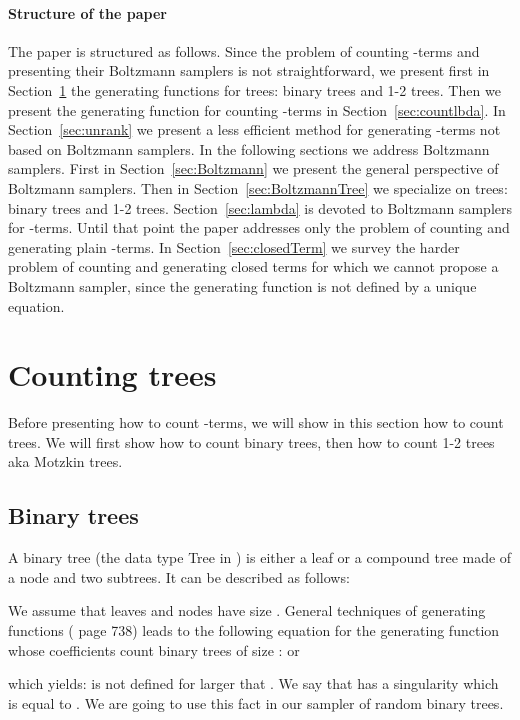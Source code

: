 \documentclass{sig-alternate}
\begin{document}
\paragraph{Structure of the paper}

The paper is structured as follows.  Since the problem of counting -terms and
presenting their Boltzmann samplers is not straightforward, we present first in
Section~\ref{sec:trees} the generating functions for trees: binary trees and 1-2
trees. Then we present the generating function for counting -terms in
Section~\ref{sec:countlbda}.  In Section~\ref{sec:unrank} we present a less efficient
method for generating -terms not based on Boltzmann samplers. In the following
sections we address Boltzmann samplers. First in Section~\ref{sec:Boltzmann} we
present the general perspective of Boltzmann samplers.  Then in
Section~\ref{sec:BoltzmannTree} we specialize on trees: binary trees and 1-2
trees. Section~\ref{sec:lambda} is devoted to Boltzmann samplers for -terms.
Until that point the paper addresses only the problem of counting and generating
plain -terms.  In Section~\ref{sec:closedTerm} we survey the harder problem of
counting and generating closed terms for which we cannot propose a Boltzmann sampler,
since the generating function is not defined by a unique equation.

\section{Counting trees}
\label{sec:trees}

Before presenting how to count -terms, we will show in this section how to count
trees. We will first show how to count binary trees, then how to count 1-2 trees aka
Motzkin trees.

\subsection{Binary trees}
\label{sec:BinTrees}

A binary tree (the data type \textsf{Tree} in \cite{DBLP:conf/icfp/ClaessenH00})
is either a leaf or a compound tree made of a node and two subtrees. It can be
described as follows:

We assume that leaves and nodes have size .  General techniques of generating
functions (\cite{flajolet08:_analy_combin} page 738) leads to the following equation
for the generating function  whose coefficients count
binary trees of size :
 or

which yields:
  is not defined for  larger
that . We say that  has a singularity  which is equal to
.  We are going to use this fact in our sampler of random binary trees.
\end{document}
